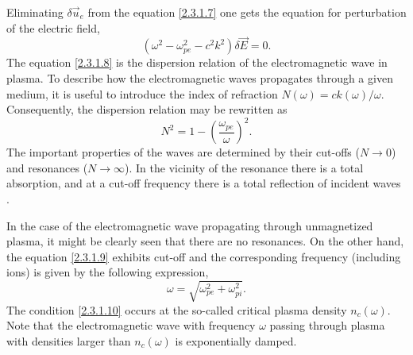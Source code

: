 Eliminating $ \delta \vec{u}_{e} $ from the equation \ref{2.3.1.7} one gets the equation for perturbation of the electric field,
\begin{equation}
\label{2.3.1.8}
\left(\omega^2 - \omega_{pe}^2 - c^2 k^2 \right) \delta \vec{E} = 0. 
\end{equation}
The equation \ref{2.3.1.8} is the dispersion relation of the electromagnetic wave in plasma. To describe how the electromagnetic waves propagates through a given medium, it is useful to introduce the index of refraction $ N \left( \omega \right) =  c k \left( \omega \right) / \omega $. Consequently, the dispersion relation may be rewritten as
\begin{equation}
\label{2.3.1.9}
N^{2} = 1 - \left(\frac{\omega_{pe}}{\omega}\right)^2.
\end{equation} 
The important properties of the waves are determined by their cut-offs ($ N \rightarrow 0 $) and resonances ($ N \rightarrow \infty $). In the vicinity of the resonance there is a total absorption, and at a cut-off frequency there is a total reflection of incident waves \cite{kruer}.

In the case of the electromagnetic wave propagating through unmagnetized plasma, it might be clearly seen that there are no resonances. On the other hand, the equation \ref{2.3.1.9} exhibits cut-off and the corresponding frequency (including ions) is given by the following expression,
\begin{equation}
\label{2.3.1.10}
\omega = \sqrt{\omega_{pe}^{2} + \omega_{pi}^{2}}.
\end{equation}
The condition \ref{2.3.1.10} occurs at the so-called critical plasma density $ n_c \left( \omega\right) $. Note that the electromagnetic wave with frequency $ \omega $ passing through plasma with densities larger than $ n_c \left( \omega\right) $ is exponentially damped.